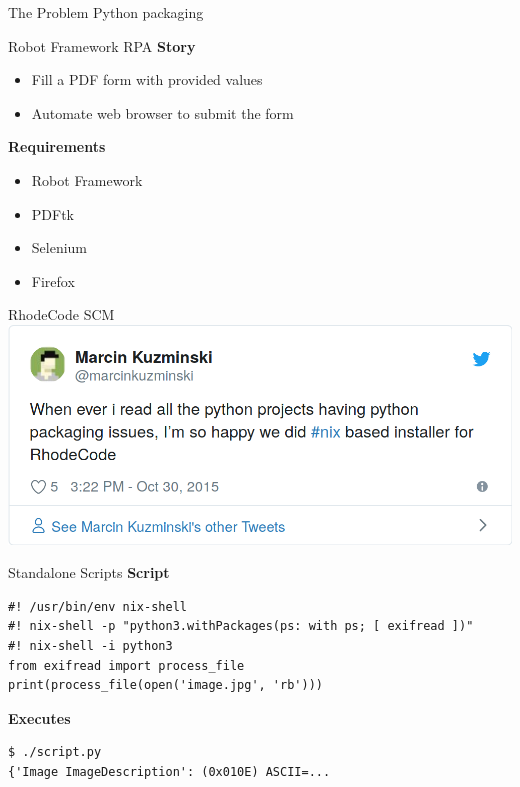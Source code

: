 \documentclass[12pt,aspectratio=169]{beamer}
\begin{document}

\begin{frame}{The Problem}
  \center\Huge
  Python packaging 
\end{frame}


\begin{frame}{Robot Framework RPA}
  \textbf{Story}
  \begin{itemize}
    \item Fill a PDF form with provided values
    \item Automate web browser to submit the form
  \end{itemize}
  \textbf{Requirements}
  \begin{itemize}
    \item Robot Framework
    \item PDFtk
    \item Selenium
    \item Firefox
  \end{itemize}
\end{frame}


\begin{frame}{RhodeCode SCM}
\includegraphics[width=0.70\paperwidth]{images/rhodecode-tweet.png}
\end{frame}


\begin{frame}[fragile]{Standalone Scripts}
  \textbf{Script}
  \begin{verbatim}
#! /usr/bin/env nix-shell
#! nix-shell -p "python3.withPackages(ps: with ps; [ exifread ])"
#! nix-shell -i python3
from exifread import process_file
print(process_file(open('image.jpg', 'rb')))
  \end{verbatim}
  \textbf{Executes}
  \begin{verbatim}
$ ./script.py
{'Image ImageDescription': (0x010E) ASCII=...
  \end{verbatim}
\end{frame}
\end{document}
